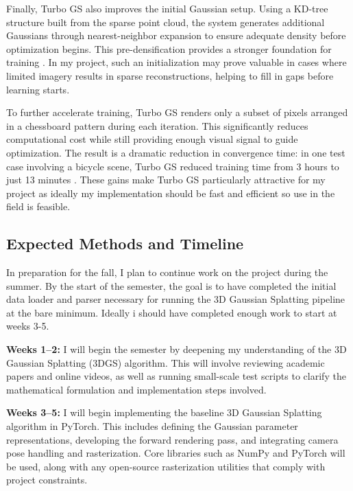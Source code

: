 \documentclass[10pt,twocolumn]{article}
\begin{document}
Finally, Turbo GS also improves the initial Gaussian setup. Using a KD-tree structure built from the sparse point cloud, the system generates additional Gaussians through nearest-neighbor expansion to ensure adequate density before optimization begins. This pre-densification provides a stronger foundation for training \cite{lu2024turbogsaccelerating3dgaussian}. In my project, such an initialization may prove valuable in cases where limited imagery results in sparse reconstructions, helping to fill in gaps before learning starts.

To further accelerate training, Turbo GS renders only a subset of pixels arranged in a chessboard pattern during each iteration. This significantly reduces computational cost while still providing enough visual signal to guide optimization. The result is a dramatic reduction in convergence time: in one test case involving a bicycle scene, Turbo GS reduced training time from 3 hours to just 13 minutes \cite{lu2024turbogsaccelerating3dgaussian}. These gains make Turbo GS particularly attractive for my project as ideally my implementation should be fast and efficient so use in the field is feasible.

\subsection{Expected Methods and Timeline}

In preparation for the fall, I plan to continue work on the project during the summer. By the start of the semester, the goal is to have completed the initial data loader and parser necessary for running the 3D Gaussian Splatting pipeline at the bare minimum. Ideally i should have completed enough work to start at weeks 3-5. 

\textbf{Weeks 1--2:} I will begin the semester by deepening my understanding of the 3D Gaussian Splatting (3DGS) algorithm. This will involve reviewing academic papers and online videos, as well as running small-scale test scripts to clarify the mathematical formulation and implementation steps involved.

\textbf{Weeks 3--5:} I will begin implementing the baseline 3D Gaussian Splatting algorithm in PyTorch. This includes defining the Gaussian parameter representations, developing the forward rendering pass, and integrating camera pose handling and rasterization. Core libraries such as NumPy and PyTorch will be used, along with any open-source rasterization utilities that comply with project constraints.
\end{document}
